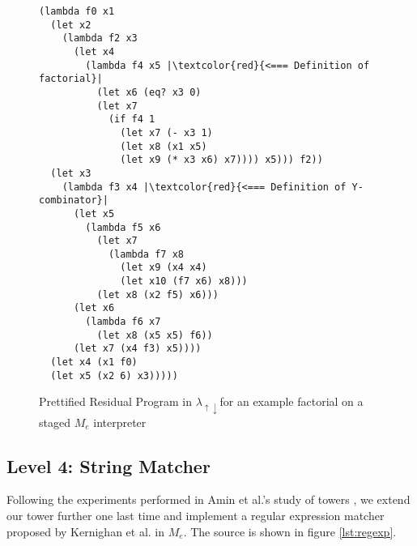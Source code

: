 \documentclass[a4paper,12pt,twoside,openright]{report}
\theoremstyle{definition}
\newcommand{\mslang}{$\lambda_{\uparrow\downarrow}$}
\newcommand{\mevl}{$M_{e}$}
\begin{document}
\begin{figure}[htp!]
\centering
     \begin{verbatim}
(lambda f0 x1
  (let x2
    (lambda f2 x3
      (let x4
        (lambda f4 x5 |\textcolor{red}{<=== Definition of factorial}|
          (let x6 (eq? x3 0)
          (let x7
            (if f4 1
              (let x7 (- x3 1)
              (let x8 (x1 x5)
              (let x9 (* x3 x6) x7)))) x5))) f2))
  (let x3
    (lambda f3 x4 |\textcolor{red}{<=== Definition of Y-combinator}|
      (let x5
        (lambda f5 x6
          (let x7
            (lambda f7 x8
              (let x9 (x4 x4)
              (let x10 (f7 x6) x8)))
          (let x8 (x2 f5) x6)))
      (let x6
        (lambda f6 x7
          (let x8 (x5 x5) f6))
      (let x7 (x4 f3) x5))))
  (let x4 (x1 f0)
  (let x5 (x2 6) x3)))))
         \end{verbatim}
         \caption{Prettified Residual Program in \mslang for an example factorial on a staged \mevl{} interpreter}
         \label{lst:mevl_staged_secd_ped}
\end{figure}
\newpage



\subsection{Level 4: String Matcher}\label{sec:string_matcher}

Following the experiments performed in Amin et al.'s study of towers \cite{amin2017collapsing}, we extend our tower further one last time and implement a regular expression matcher proposed by Kernighan et al. \cite{kernighan2007regular} in \mevl. The source is shown in figure \ref{lst:regexp}.
\end{document}

